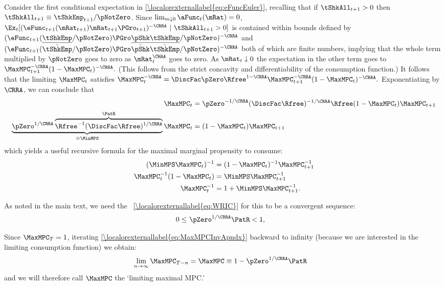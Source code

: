 \documentclass[\econtexRoot/BufferStockTheory]{subfiles}
\begin{document}
Consider the first conditional expectation in \eqref{\localorexternallabel{eq:eFuncEuler}},
recalling that if $\tShkAll_{t+1}>0$ then $\tShkAll_{t+1} \equiv
\tShkEmp_{t+1}/\pNotZero$.  Since $\lim_{m \downarrow 0}
\aFunc_{t}(\mRat) = 0$,
$\Ex_{t}[(\eFunc_{t+1}(\mRat_{t+1})\mRat_{t+1}\PGro_{t+1})^{-\CRRA}~|~\tShkAll_{t+1}>0]$
is contained within bounds defined by
$(\eFunc_{t+1}(\ushort{\tShkEmp}/\pNotZero) \PGro\ushort{\pShk}
\ushort{\tShkEmp}/\pNotZero)^{-\CRRA}$ and
$(\eFunc_{t+1}(\bar{\tShkEmp}/\pNotZero) \PGro\bar{\pShk}
\bar{\tShkEmp}/\pNotZero)^{-\CRRA}$ both of which are finite numbers,
implying that the whole term multiplied by $\pNotZero$ goes to zero as
$\mRat_{t}^{\CRRA}$ goes to zero.  As $\mRat_{t} \downarrow 0$ the
expectation in the other term goes to $\MaxMPC _{t+1}^{-\CRRA
}(1-\MaxMPC _{t})^{-\CRRA }.$ (This follows from the strict concavity
and differentiability of the consumption function.) It follows that
the limiting $\MaxMPC_{t}$ satisfies $\MaxMPC_{t}^{-\CRRA }=\DiscFac
\pZero\Rfree^{1-\CRRA }\MaxMPC_{t+1}^{-\CRRA }(1-\MaxMPC
_{t})^{-\CRRA }.$ Exponentiating by $\CRRA$, we can conclude that
\begin{align}
\MaxMPC_{t} & = \pZero^{-1/\CRRA} (\DiscFac
\Rfree)^{-1/\CRRA}\Rfree(1-\MaxMPC _{t})\MaxMPC _{t+1} \notag
\\ \underbrace{\pZero^{1/\CRRA}\overbrace{{\Rfree}^{-1}(\DiscFac
    \Rfree)^{1/\CRRA}}^{\PatR}}_{\equiv \MinMPS}
\MaxMPC_{t} & = (1-\MaxMPC _{t})\MaxMPC _{t+1} \label{eq:MinMPSDef}
\end{align}
which yields a useful recursive formula for the maximal marginal propensity to consume:
\begin{align}
  (\MinMPS \MaxMPC_{t})^{-1}  & = (1-\MaxMPC_{t})^{-1}\MaxMPC_{t+1}^{-1}  \notag
\\ \MaxMPC_{t}^{-1}(1-\MaxMPC_{t})  & = \MinMPS \MaxMPC_{t+1}^{-1}   \notag
\\ \MaxMPC_{t}^{-1}  & = 1+\MinMPS \MaxMPC_{t+1}^{-1} \label{eq:MaxMPCInvApndx}.
\end{align}

As noted in the main text, we need the \WRIC~\eqref{\localorexternallabel{eq:WRIC}} for this to be a convergent sequence:
\begin{align}
  0 \leq & ~\pZero^{1/\CRRA} \PatR < 1 \label{eq:WRICapndx},
\end{align}

Since $\MaxMPC_{T}=1$, iterating \eqref{\localorexternallabel{eq:MaxMPCInvApndx}} backward to
infinity (because we are interested in the limiting consumption function) we obtain:
\begin{align}
\lim_{n\rightarrow\infty}\MaxMPC_{T-n} 
& = \MaxMPC \equiv 1-\pZero^{1/\CRRA}\PatR  \label{eq:MaxMPCDef}
\end{align}
and we will therefore call $\MaxMPC$ the `limiting maximal MPC.'
\end{document}
